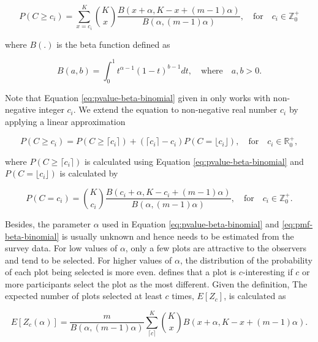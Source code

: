 \documentclass[]{interact}
\theoremstyle{plain}%
\theoremstyle{definition}
\theoremstyle{remark}
\begin{document}
\begin{equation} \label{eq:pvalue-beta-binomial}
P(C \geq c_i) = \sum_{x=c_i}^{K}{K \choose x}\frac{B(x + \alpha, K - x + (m - 1)\alpha)}{B(\alpha, (m-1)\alpha)},\quad \text{for} \quad c_i \in \mathbb{Z}_0^+
\end{equation}

\noindent where \(B(.)\) is the beta function defined as

\begin{equation} \label{eq:betafunction}
B(a, b) = \int_{0}^{1}t^{\alpha - 1}(1-t)^{b-1}dt,\quad \text{where}\quad a,b>0. 
\end{equation}

Note that Equation \ref{eq:pvalue-beta-binomial} given in
\citet{vanderplas2021statistical} only works with non-negative integer
\(c_i\). We extend the equation to non-negative real number \(c_i\) by
applying a linear approximation

\begin{equation} \label{eq:pvalue-beta-binomial-approx}
P(C \geq c_i) = P(C \geq \lceil c_i \rceil) + (\lceil c_i \rceil - c_i) P(C = \lfloor c_i \rfloor), \quad \text{for}\quad c_i \in \mathbb{R}_0^+,
\end{equation}

where \(P(C \geq \lceil c_i \rceil)\) is calculated using Equation
\ref{eq:pvalue-beta-binomial} and \(P(C = \lfloor c_i \rfloor)\) is
calculated by

\begin{equation} \label{eq:pmf-beta-binomial}
P(C = c_i) = {K \choose c_i}\frac{B(c_i + \alpha, K - c_i + (m - 1)\alpha)}{B(\alpha, (m-1)\alpha)},\quad \text{for} \quad c_i \in \mathbb{Z}_0^+.
\end{equation}

Besides, the parameter \(\alpha\) used in Equation
\ref{eq:pvalue-beta-binomial} and \ref{eq:pmf-beta-binomial} is usually
unknown and hence needs to be estimated from the survey data. For low
values of \(\alpha\), only a few plots are attractive to the observers
and tend to be selected. For higher values of \(\alpha\), the
distribution of the probability of each plot being selected is more
even. \citet{vanderplas2021statistical} defines that a plot is
\(c\)-interesting if \(c\) or more participants select the plot as the
most different. Given the definition, The expected number of plots
selected at least \(c\) times, \(E[Z_c]\), is calculated as

\begin{equation} \label{eq:c-interesting-expectation}
E[Z_c(\alpha)] = \frac{m}{B(\alpha, (m-1)\alpha)}\sum_{\lceil c \rceil}^{K}{K \choose x} B(x + \alpha, K - x + (m-1)\alpha).\end{equation}
\end{document}
